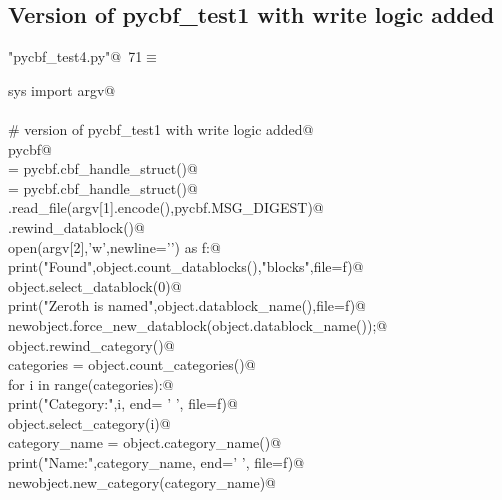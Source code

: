 \documentclass[10pt,a4paper,twoside,notitlepage]{article}
\begin{document}
\subsection{Version of pycbf\_test1 with write logic added}

\begin{flushleft} \small
\begin{minipage}{\linewidth}\label{scrap16}\raggedright\small
{} \verb@"pycbf_test4.py"@\nobreak\ {\footnotesize {71}}$\equiv$
\vspace{-1ex}
\begin{list}{}{} \item
\mbox{}\verb@from sys import argv@\\
\mbox{}\verb@@\\
\mbox{}\verb@# version of pycbf_test1 with write logic added@\\
\mbox{}\verb@import pycbf@\\
\mbox{}\verb@object = pycbf.cbf_handle_struct()@\\
\mbox{}\verb@newobject = pycbf.cbf_handle_struct()@\\
\mbox{}\verb@object.read_file(argv[1].encode(),pycbf.MSG_DIGEST)@\\
\mbox{}\verb@object.rewind_datablock()@\\
\mbox{}\verb@with open(argv[2],'w',newline='\n') as f:@\\
\mbox{}\verb@    print("Found",object.count_datablocks(),"blocks",file=f)@\\
\mbox{}\verb@    object.select_datablock(0)@\\
\mbox{}\verb@    print("Zeroth is named",object.datablock_name(),file=f)@\\
\mbox{}\verb@    newobject.force_new_datablock(object.datablock_name());@\\
\mbox{}\verb@    object.rewind_category()@\\
\mbox{}\verb@    categories = object.count_categories()@\\
\mbox{}\verb@    for i in range(categories):@\\
\mbox{}\verb@        print("Category:",i, end= ' ', file=f)@\\
\mbox{}\verb@        object.select_category(i)@\\
\mbox{}\verb@        category_name = object.category_name()@\\
\mbox{}\verb@        print("Name:",category_name, end=' ', file=f)@\\
\mbox{}\verb@        newobject.new_category(category_name)@\\

\end{list}
\end{minipage}
\end{flushleft}
\end{document}
